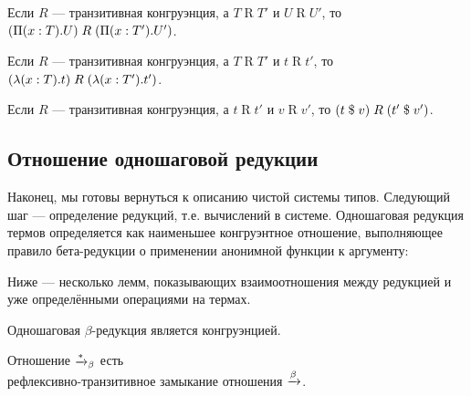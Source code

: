 \begin{lemma}
Если $R$ --- транзитивная конгруэнция, а
$T \mathrel{R} T'$ и $U \mathrel{R} U'$, то
$(\Pi(x:T).U) \mathrel{R} (\Pi(x:T').U')$.
\end{lemma}

\begin{lemma}
Если $R$ --- транзитивная конгруэнция, а
$T \mathrel{R} T'$ и $t \mathrel{R} t'$, то
$(\lambda(x:T).t) \mathrel{R} (\lambda(x:T').t')$.
\end{lemma}

\begin{lemma}
Если $R$ --- транзитивная конгруэнция, а
$t \mathrel{R} t'$ и $v \mathrel{R} v'$, то
$(t\;\$\;v) \mathrel{R} (t'\;\$\;v')$.
\end{lemma}

\subsection{Отношение одношаговой редукции}

Наконец, мы готовы вернуться к описанию чистой системы
типов. Следующий шаг --- определение редукций, т.е.
вычислений в системе. Одношаговая редукция термов
определяется как наименьшее конгруэнтное отношение,
выполняющее правило бета-редукции о применении
анонимной функции к аргументу:


Ниже --- несколько лемм, показывающих взаимоотношения
между редукцией и уже определёнными операциями на
термах.

\begin{instance}
Одношаговая $\beta$-редукция является конгруэнцией.
\end{instance}

\begin{definition}
Отношение $\xrightarrow{*}_{\beta}$ есть \\ рефлексивно-транзитивное
замыкание отношения $\xrightarrow{\beta}$.
\end{definition}

